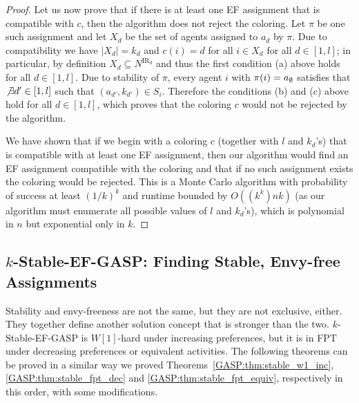 \begin{proof}
Let us now prove that if there is at least one EF assignment that is compatible with $c$, then the algorithm does not reject the coloring. Let $\pi$ be one such assignment and let $X_d$ be the set of agents assigned to $a_d$ by $\pi$. Due to compatibility we have $|X_d| = k_d$ and $c(i) = d$ for all $i \in X_d$ for all $d\in [1, l]$; in particular, by definition $X_d \subseteq N^{\text{IR}_d}$ and thus the first condition (a) above holds for all $d\in [1, l]$. Due to stability of $\pi$, every agent $i$ with $\pi(i) = a_{\emptyset}$ satisfies that $\not\exists d'\in [1, l]$ such that $(a_{d'}, k_{d'}) \in S_i$. Therefore the conditions (b) and (c) above hold for all $d\in [1, l]$, which proves that the coloring $c$ would not be rejected by the algorithm.

We have shown that if we begin with a coloring $c$ (together with $l$ and $k_d$'s) that is compatible with at least one EF assignment, then our algorithm would find an EF assignment compatible with the coloring and that if no such assignment exists the coloring would be rejected. This is a Monte Carlo algorithm with probability of success at least $(1/k)^k$ and runtime bounded by $O((k^k)nk)$ (as our algorithm must enumerate all possible values of $l$ and $k_d$'s), which is polynomial in $n$ but exponential only in $k$. 
\end{proof}





\subsection{$k$-Stable-EF-GASP: Finding Stable, Envy-free Assignments}
Stability and envy-freeness are not the same, but they are not exclusive, either. They together define another solution concept that is stronger than the two.
$k$-Stable-EF-GASP is $W[1]$-hard under increasing preferences, but it is in FPT under decreasing preferences or equivalent activities.
The following theorems can be proved in a similar way we proved Theorems~\ref{GASP:thm:stable_w1_inc}, \ref{GASP:thm:stable_fpt_dec} and \ref{GASP:thm:stable_fpt_equiv}, respectively in this order, with some modifications.

